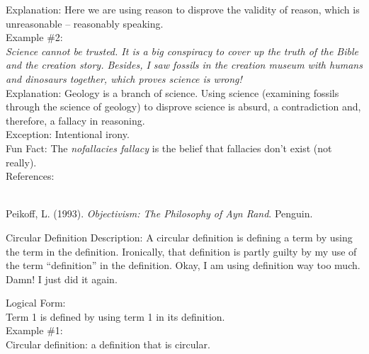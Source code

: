 \documentclass[a4paper,12pt,single,pdftex]{scrbook}
\begin{document}
      
        Explanation: Here we are using reason to disprove the validity of reason, which is unreasonable -- reasonably speaking.
      \\

      
        Example \#2:
      \\

      
        {\em Science cannot be trusted.  It is a big conspiracy to cover up the truth of the Bible and the creation story.  Besides, I saw fossils in the creation museum with humans and dinosaurs together, which proves science is wrong!}
      \\

      
        Explanation: Geology is a branch of science.  Using science (examining fossils through the science of geology) to disprove science is absurd, a contradiction and, therefore, a fallacy in reasoning.
      \\

      
        Exception: Intentional irony.
      \\

      
        Fun Fact: The {\em nofallacies fallacy} is the belief that fallacies don't exist (not really).
      \\

    
    References:

    
      
        
      \\

      
        
          Peikoff, L. (1993). {\it Objectivism: The Philosophy of Ayn Rand}. Penguin.
        
      
    
  

Circular Definition
    Description: A circular definition is defining a term by using the term in the definition.  Ironically, that definition is partly guilty by my use of the term “definition” in the definition.  Okay, I am using definition way too much. Damn!  I just did it again.

    
      Logical Form:
    \\

    
      Term 1 is defined by using term 1 in its definition.
    \\

    
      Example \#1:
    \\

    
       Circular definition: a definition that is circular.
    \\
\end{document}
